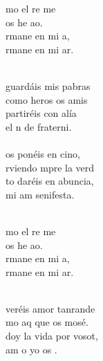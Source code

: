 \begin{cancion}[Amaos][Kairoi]%
	\begin{chorus}%
	mo el re me  \\
	 os he ao.\\
	rmane en mi a,\\
	rmane en mi ar.\\
	\end{chorus}%
	\jump\\
	guardáis mis pabras\\
	como heros os amis\\
	partiréis con alía\\
	el n de fraterni.\\
\jump\\
	os ponéis en cino,\\
	rviendo mpre la verd\\
	to daréis en abuncia,\\
	mi am senifesta.\\\jump\\
	\begin{chorus}%
	mo el re me  \\
	 os he ao.\\
	rmane en mi a,\\
	rmane en mi ar.\\
	\end{chorus}%
	\jump\\
	veréis amor tanrande\\
	mo aq que os mosé.\\
	doy la vida por vosot,\\
	am o yo os . \\

\end{cancion}
